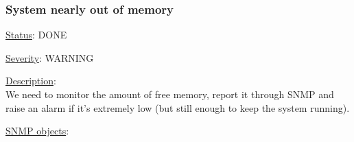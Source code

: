 \subsubsection{\bf System nearly out of memory}
		\label{fail:other:no_mem}
		\begin{pck_descr}
			\item [] \underline{Status}: DONE
			\item [] \underline{Severity}: WARNING
			\item [] \underline{Description}:\\
				We need to monitor the amount of free memory, report it through SNMP and
				raise an alarm if it's extremely low (but still enough to keep the
				system running).
			\item [] \underline{SNMP objects}:\\
        {\footnotesize
        \\
				\\
				\\
				\\
				\\
				\\
         }
		\end{pck_descr}
